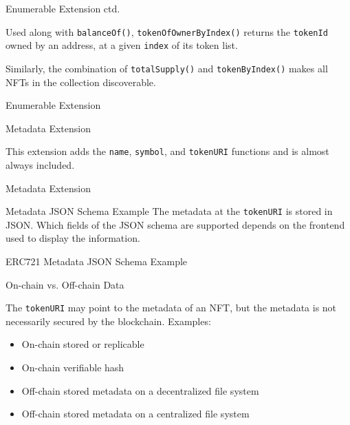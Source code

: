 \documentclass[handout]{beamer}
\begin{document}
\begin{frame}{Enumerable Extension ctd.}

Used along with \texttt{balanceOf()}, \texttt{tokenOfOwnerByIndex()} returns the \texttt{tokenId} owned by an address, at a given \texttt{index} of its token list. 

\vspace{0.5em}

Similarly, the combination of \texttt{totalSupply()} and \texttt{tokenByIndex()} makes all NFTs in the collection discoverable.
\vspace{0.5em}
	\begin{samplecode}{Enumerable Extension}
		
	\end{samplecode}
\end{frame}

\begin{frame}{Metadata Extension}

This extension adds the \texttt{name}, \texttt{symbol}, and \texttt{tokenURI} functions and is almost always included.
\vspace{0.5em}
	\begin{samplecode}{Metadata Extension}
		
	\end{samplecode}
\end{frame}

\begin{frame}{Metadata JSON Schema Example}
The metadata at the \texttt{tokenURI} is stored in JSON. Which fields of the JSON schema are supported depends on the frontend used to display the information.
\vspace{0.5em}
\begin{samplecode}{ERC721 Metadata JSON Schema Example}
	
\end{samplecode}
\end{frame}

\begin{frame}{On-chain vs. Off-chain Data}

The \texttt{tokenURI} may point to the metadata of an NFT, but the metadata is not necessarily secured by the blockchain. Examples:\\
	\begin{itemize}
		\item<2-> On-chain stored or replicable
		\item<3-> On-chain verifiable hash
		\item<4-> Off-chain stored metadata on a decentralized file system
		\item<5-> Off-chain stored metadata on a centralized file system
	\end{itemize}
\end{frame}
\end{document}

